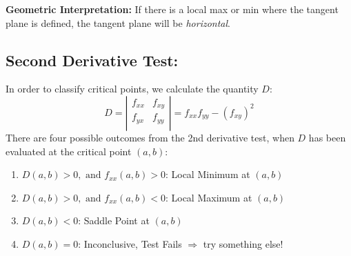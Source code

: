 \textbf{Geometric Interpretation:} If there is a local max or min where the tangent plane is defined, the tangent plane will be \textit{horizontal}.\\


\vspace*{.1in}


\subsection*{Second Derivative Test:}
In order to classify critical points, we calculate the quantity \(D\):
\[
D = \left|\begin{matrix}
f_{xx} & f_{xy}\\
f_{yx} & f_{yy}\\
\end{matrix}\right|
= f_{xx} f_{yy} - \left(f_{xy}\right)^2
\]
There are four possible outcomes from the 2nd derivative test, when \(D\) has been evaluated at the critical point \((a,b)\):
\begin{enumerate}[{Case} 1:]
\item \(D(a,b) > 0, \text{ and } f_{xx}(a,b) > 0\): Local Minimum at \((a,b)\)
\item \(D(a,b) > 0, \text{ and } f_{xx}(a,b) < 0\): Local Maximum at \((a,b)\)
\item \(D(a,b) < 0\): Saddle Point at \((a,b)\)
\item \(D(a,b) =0\): Inconclusive, Test Fails \(\Rightarrow\) try something else!
\end{enumerate}


%
%
%
%
%
%

\vspace*{.1in}

